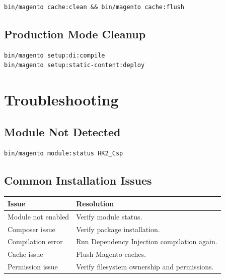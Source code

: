 \documentclass[11pt,a4paper]{article}
\begin{document}
\begin{lstlisting}[style=shell]
bin/magento cache:clean && bin/magento cache:flush
\end{lstlisting}

\subsection{Production Mode Cleanup}

\begin{lstlisting}[style=shell]
bin/magento setup:di:compile
bin/magento setup:static-content:deploy
\end{lstlisting}

\section{Troubleshooting}

\subsection{Module Not Detected}

\begin{lstlisting}[style=shell]
bin/magento module:status HK2_Csp
\end{lstlisting}

\subsection{Common Installation Issues}

\begin{longtable}{ll}
\toprule
\textbf{Issue} & \textbf{Resolution} \\
\midrule
\endhead
Module not enabled & Verify module status. \\
Composer issue & Verify package installation. \\
Compilation error & Run Dependency Injection compilation again. \\
Cache issue & Flush Magento caches. \\
Permission issue & Verify filesystem ownership and permissions. \\
\bottomrule
\end{longtable}

\end{document}
